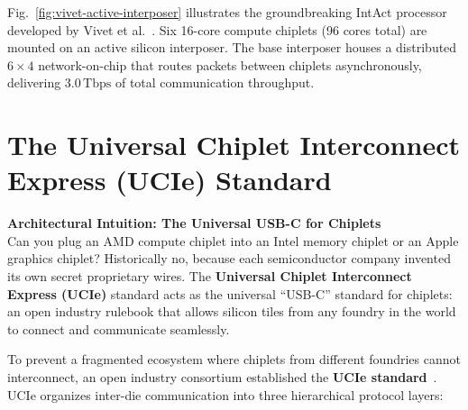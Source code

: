 Fig.~\ref{fig:vivet-active-interposer} illustrates the groundbreaking IntAct processor developed by Vivet et al.~\cite{Vivet2021}. Six 16-core compute chiplets (96 cores total) are mounted on an active silicon interposer. The base interposer houses a distributed $6 \times 4$ network-on-chip that routes packets between chiplets asynchronously, delivering $3.0\,\mathrm{Tbps}$ of total communication throughput.

\section{The Universal Chiplet Interconnect Express (UCIe) Standard}
\label{sec:ucie-standard}

\begin{svgraybox}
\textbf{Architectural Intuition: The Universal USB-C for Chiplets} \\
Can you plug an AMD compute chiplet into an Intel memory chiplet or an Apple graphics chiplet? Historically no, because each semiconductor company invented its own secret proprietary wires. The \textbf{Universal Chiplet Interconnect Express (UCIe)} standard acts as the universal ``USB-C'' standard for chiplets: an open industry rulebook that allows silicon tiles from any foundry in the world to connect and communicate seamlessly.
\end{svgraybox}

To prevent a fragmented ecosystem where chiplets from different foundries cannot interconnect, an open industry consortium established the \textbf{UCIe standard}~\cite{UCIe2023,DasSharma2022}. UCIe organizes inter-die communication into three hierarchical protocol layers:

